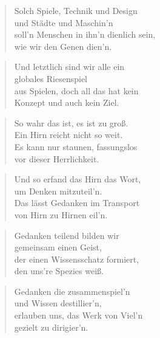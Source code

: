 \documentclass[10pt,a4paper]{article}
\begin{document}
\begin{paracol}{2}
\begin{verse}
Solch Spiele, Technik und Design \\
und Städte und Maschin’n \\
soll’n Menschen in ihn’n dienlich sein, \\
wie wir den Genen dien’n. \\
\end{verse}

\begin{verse}
Und letztlich sind wir alle ein \\
globales Riesenspiel \\
aus Spielen, doch all das hat kein \\
Konzept und auch kein Ziel. \\
\end{verse}

\begin{verse}
So wahr das ist, es ist zu groß. \\
Ein Hirn reicht nicht so weit. \\
Es kann nur staunen, fassungslos \\
vor dieser Herrlichkeit. \\
\end{verse}

\begin{verse}
Und so erfand das Hirn das Wort, \\
um Denken mitzuteil’n. \\
Das lässt Gedanken im Transport \\
von Hirn zu Hirnen eil’n. \\
\end{verse}

\begin{verse}
Gedanken teilend bilden wir \\
gemeinsam einen Geist, \\
der einen Wissensschatz formiert, \\
den uns’re Spezies weiß. \\
\end{verse}

\begin{verse}
Gedanken die zusammenspiel’n \\
und Wissen destillier’n, \\
erlauben uns, das Werk von Viel’n \\
gezielt zu dirigier’n. \\
\end{verse}


\end{paracol}
\end{document}
